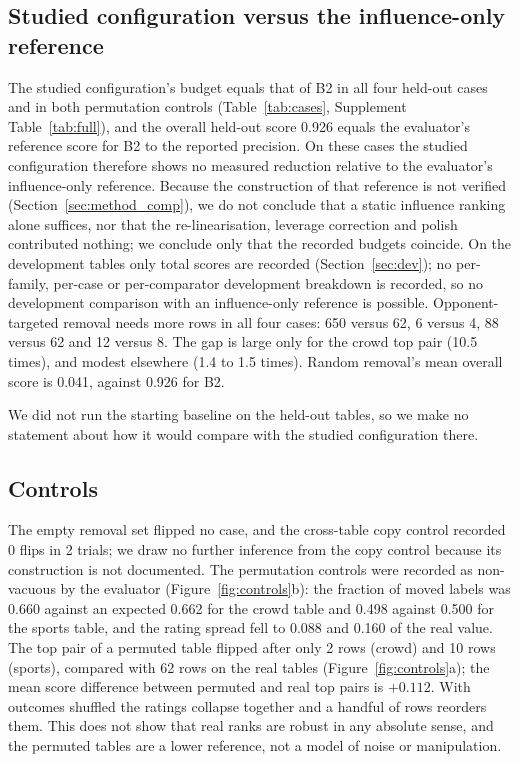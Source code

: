 \documentclass{article}
\begin{document}
\subsection{Studied configuration versus the influence-only reference}
The studied configuration's budget equals that of B2 in all four held-out cases and in both permutation controls (Table~\ref{tab:cases}, Supplement Table~\ref{tab:full}), and the overall held-out score 0.926 equals the evaluator's reference score for B2 to the reported precision. %
On these cases the studied configuration therefore shows no measured reduction relative to the evaluator's influence-only reference. Because the construction of that reference is not verified (Section~\ref{sec:method_comp}), we do not conclude that a static influence ranking alone suffices, nor that the re-linearisation, leverage correction and polish contributed nothing; we conclude only that the recorded budgets coincide. On the development tables only total scores are recorded (Section~\ref{sec:dev}); no per-family, per-case or per-comparator development breakdown is recorded, so no development comparison with an influence-only reference is possible. Opponent-targeted removal needs more rows in all four cases: 650 versus 62, 6 versus 4, 88 versus 62 and 12 versus 8. The gap is large only for the crowd top pair (10.5 times), and modest elsewhere (1.4 to 1.5 times). Random removal's mean overall score is 0.041, against 0.926 for B2. %

We did not run the starting baseline on the held-out tables, so we make no statement about how it would compare with the studied configuration there.

\subsection{Controls}\label{sec:controls}
The empty removal set flipped no case, and the cross-table copy control recorded 0 flips in 2 trials; we draw no further inference from the copy control because its construction is not documented. The permutation controls were recorded as non-vacuous by the evaluator (Figure~\ref{fig:controls}b): the fraction of moved labels was 0.660 against an expected 0.662 for the crowd table and 0.498 against 0.500 for the sports table, and the rating spread fell to 0.088 and 0.160 of the real value. %
The top pair of a permuted table flipped after only 2 rows (crowd) and 10 rows (sports), compared with 62 rows on the real tables (Figure~\ref{fig:controls}a); the mean score difference between permuted and real top pairs is $+0.112$. %
With outcomes shuffled the ratings collapse together and a handful of rows reorders them. This does not show that real ranks are robust in any absolute sense, and the permuted tables are a lower reference, not a model of noise or manipulation.
\end{document}
